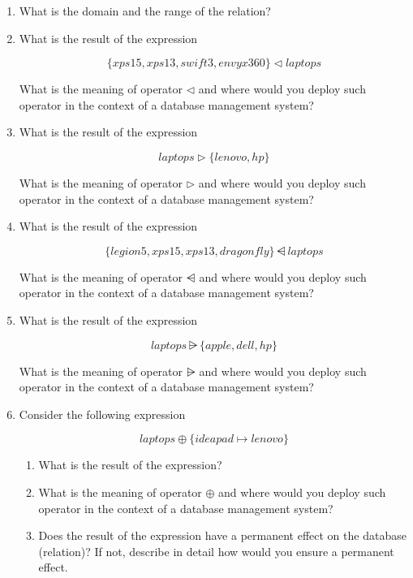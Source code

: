\begin{enumerate}

\item What is the domain and the range of the relation?\\

\item What is the result of the expression

\[ \{ xps15, xps13, swift3, envyx360 \}  \lhd laptops \]

\noindent What is the meaning of operator $\lhd$ and where would you deploy such operator in the context of a database management system?

\item What is the result of the expression

\[ laptops \rhd \{ lenovo, hp \} \]

\noindent What is the meaning of operator $\rhd$ and where would you deploy such operator in the context of a database management system?

\item What is the result of the expression

\[ \{ legion5, xps15, xps13, dragonfly \} \ndres laptops \]

\noindent What is the meaning of operator $\ndres$ and where would you deploy such operator in the context of a database management system?

\item What is the result of the expression

\[ laptops \nrres \{ apple, dell, hp \} \]

\noindent What is the meaning of operator $\nrres$ and where would you deploy such operator in the context of a database management system?

\item Consider the following expression

\[ laptops \oplus \{ ideapad \mapsto lenovo \} \]

\begin{enumerate}
\item What is the result of the expression?

\item What is the meaning of operator $\oplus$ and where would you deploy such operator in the context of a database management system?

\item Does the result of the expression have a permanent effect on the database (relation)? If not, describe in detail how would you ensure a permanent effect. 

\end{enumerate}

\end{enumerate}


